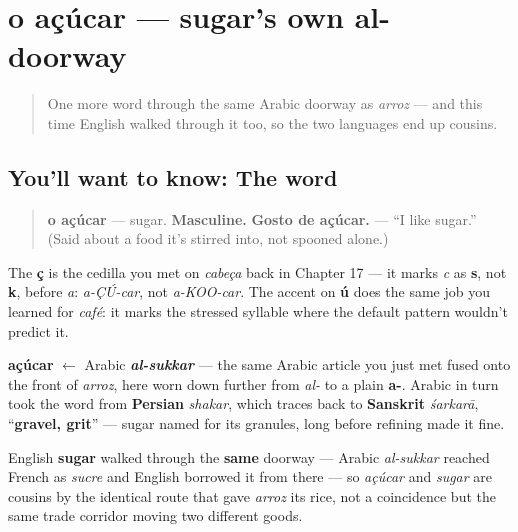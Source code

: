 \section[o açúcar]{o açúcar — sugar's own al- doorway}

\label{lesson:PT-C24-acucar}



\begin{quote}
One more word through the same Arabic doorway as \emph{arroz} — and this time English walked through it too, so the two languages end up cousins.
\end{quote}

\subsection*{You'll want to know: The word}
\begin{quote}
\textbf{o açúcar} — sugar. \textbf{Masculine.} \textbf{Gosto de açúcar.} — \textquotedblleft{}I like sugar.\textquotedblright{} (Said about a food it's stirred into, not spooned alone.)
\end{quote}

The \textbf{ç} is the cedilla you met on \emph{cabeça} back in Chapter 17 — it marks \emph{c} as \textbf{s}, not \textbf{k}, before \emph{a}: \emph{a-ÇÚ-car}, not \emph{a-KOO-car}. The accent on \textbf{ú} does the same job you learned for \emph{café}: it marks the stressed syllable where the default pattern wouldn't predict it.

\begin{cousinweb}
\textbf{açúcar} $\leftarrow$ Arabic \emph{\textbf{al-sukkar}} — the same Arabic article you just met fused onto the front of \emph{arroz}, here worn down further from \emph{al-} to a plain \textbf{a-}. Arabic in turn took the word from \textbf{Persian} \emph{shakar}, which traces back to \textbf{Sanskrit} \emph{śarkarā}, \textquotedblleft{}\textbf{gravel, grit}\textquotedblright{} — sugar named for its granules, long before refining made it fine.

English \textbf{sugar} walked through the \textbf{same} doorway — Arabic \emph{al-sukkar} reached French as \emph{sucre} and English borrowed it from there — so \emph{açúcar} and \emph{sugar} are cousins by the identical route that gave \emph{arroz} its rice, not a coincidence but the same trade corridor moving two different goods.
\end{cousinweb}

